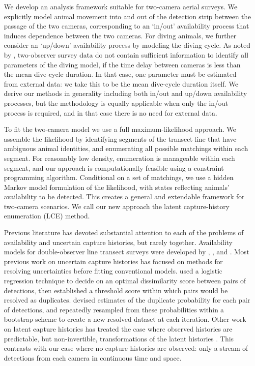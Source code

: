 \documentclass[useAMS, usenatbib, referee]{biom}\usepackage[]{graphicx}\usepackage[]{color}
\begin{document}
We develop an analysis framework suitable for two-camera aerial surveys. We explicitly model animal movement into and out of the detection strip between the passage of the two cameras, corresponding to an `in/out' availability process that induces dependence between the two cameras. For diving animals, we further consider an `up/down' availability process by modeling the diving cycle. As noted by \cite{Stevenson+al:19}, two-observer survey data do not contain sufficient information to identify all parameters of the diving model, if the time delay between cameras is less than the mean dive-cycle duration. In that case, one parameter must be estimated from external data: we take this to be the mean dive-cycle duration itself. We derive our methods in generality including both in/out and up/down availability processes, but the methodology is equally applicable when only the in/out process is required, and in that case there is no need for external data.

To fit the two-camera model we use a full maximum-likelihood approach. We assemble the likelihood by identifying segments of the transect line that have ambiguous animal identities, and enumerating all possible matchings within each segment. For reasonably low density, enumeration is manageable within each segment, and our approach is computationally feasible using a constraint programming algorithm. Conditional on a set of matchings, we use a hidden Markov model formulation of the likelihood, with states reflecting animals' availability to be detected. This creates a general and extendable framework for two-camera scenarios. We call our new approach the latent capture-history enumeration (LCE) method.


Previous literature has devoted substantial attention to each of the problems of availability and uncertain capture histories, but rarely together. Availability models for double-observer line transect surveys were developed by \cite{Borchers+al:13}, \cite{Langrock+al:13}, and \cite{Borchers+Langrock:15}. Most previous work on uncertain capture histories has focused on methods for resolving uncertainties before fitting conventional models. \cite{Pike+DoniolValcroze:15} used a logistic regression technique to decide on an optimal dissimilarity score between pairs of detections, then established a threshold score within which pairs would be resolved as duplicates. \cite{Hamilton+al:18} devised estimates of the duplicate probability for each pair of detections, and repeatedly resampled from these probabilities within a bootstrap scheme to create a new resolved dataset at each iteration. Other work on latent capture histories has treated the case where observed histories are predictable, but non-invertible, transformations of the latent histories \citep[e.g.][]{Zhang+al:19,Bonner+Holmberg:13,Link+al:10}. This contrasts with our case where no capture histories are observed: only a stream of detections from each camera in continuous time and space.
\end{document}
